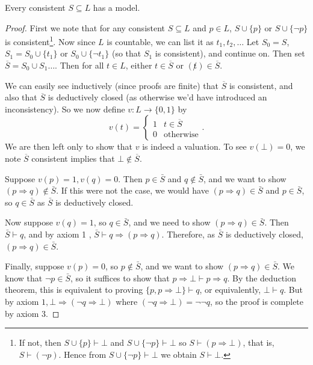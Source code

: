 \documentclass[a4paper]{scrartcl}
\begin{document}
\begin{lemma}
Every consistent $S \subseteq L$ has a model.
\end{lemma}
\begin{proof}
  First we note that for any consistent $S \subseteq L$ and $p \in L$, $S \cup \{p\}$ or $S \cup \{\lnot p\}$ is consistent\footnote{If not, then $S \cup \{p\} \vdash \bot$ and $S \cup \{\lnot p\} \vdash \bot$ so $S \vdash (p \Rightarrow \bot)$, that is, $S \vdash (\lnot p)$. Hence from $S \cup \{\lnot p\} \vdash \bot$ we obtain $S \vdash \bot$.}. Now since $L$ is countable, we can list it as $t_1, t_2, \dots$ Let $S_0 = S$, $S_1 = S_0 \cup \{t_1\}$ or $S_0 \cup \{\lnot t_1\}$ (so that $S_1$ is consistent), and continue on. Then set $\overline{S} = S_0 \cup S_1 \dots$. Then for all $t \in L$, either $t \in \overline{S}$ or $(\not t) \in \overline{S}$.

  We can easily see inductively (since proofs are finite) that $\overline{S}$ is consistent, and also that $\overline{S}$ is deductively closed (as otherwise we'd have introduced an inconsistency). So we now define $v: L \rightarrow \{0, 1\}$ by
  $$
  v(t) = \begin{cases}
        1 & t \in \overline{S}\\
        0 & \text{otherwise}
       \end{cases}.
  $$
We are then left only to show that $v$ is indeed a valuation. To see $v(\bot) = 0$, we note $\overline{S}$ consistent implies that $\bot \not \in \overline{S}$. 

Suppose $v(p)=1, v(q)=0$. Then $p \in \bar{S}$ and $q \notin \bar{S}$, and we want to show $(p \Rightarrow q) \notin \bar{S}$. If this were not the case, we would have $(p \Rightarrow q) \in \bar{S}$ and $p \in \bar{S}$, so $q \in \bar{S}$ as $\bar{S}$ is deductively closed.

Now suppose $v(q)=1$, so $q \in \bar{S}$, and we need to show $(p \Rightarrow q) \in \bar{S}$. Then $\bar{S} \vdash q$, and by axiom 1 , $\bar{S} \vdash q \Rightarrow(p \Rightarrow q)$. Therefore, as $\bar{S}$ is deductively closed, $(p \Rightarrow q) \in \bar{S}$.

Finally, suppose $v(p)=0$, so $p \notin \bar{S}$, and we want to show $(p \Rightarrow q) \in \bar{S}$. We know that $\neg p \in \bar{S}$, so it suffices to show that $p \Rightarrow \bot \vdash p \Rightarrow q$. By the deduction theorem, this is equivalent to proving $\{p, p \Rightarrow \bot\} \vdash q$, or equivalently, $\bot \vdash q$. But by axiom $1, \bot \Rightarrow(\neg q \Rightarrow \bot)$ where $(\neg q \Rightarrow \bot)=\neg \neg q$, so the proof is complete by axiom 3.
\end{proof}
\end{document}
